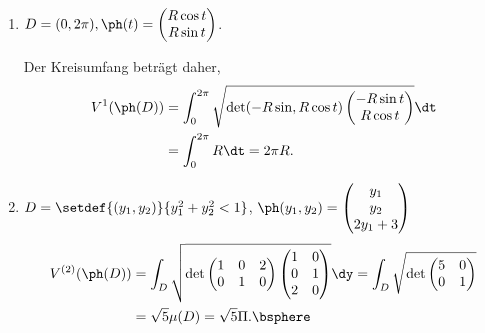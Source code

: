 \begin{bsp}
\label{bsp:4.20}
\begin{enumerate}[label=\arabic{*}.)]
  \item $D=(0,2\pi), \ph(t) = \begin{pmatrix}R\cos t\\R\sin t\end{pmatrix}$.
                              
Der Kreisumfang beträgt daher,
\begin{align*}
V^{1}(\ph(D)) &= \int_0^{2\pi} \sqrt{\det (-R\sin,R\cos t)\begin{pmatrix}-R\sin
t\\R\cos t\end{pmatrix}} \dt \\ &= \int_0^{2\pi} R\dt = 2\pi R.
\end{align*}
\item $D=\setdef{(y_1,y_2)}{y_1^2+y_2^2 < 1}$, $\ph(y_1,y_2) = \begin{pmatrix}
y_1 \\ y_2 \\ 2y_1 + 3
\end{pmatrix}$
\begin{align*}
V^{(2)}(\ph(D)) &= \int_D \sqrt{\det
\begin{pmatrix}
1 & 0 & 2\\ 0 & 1 & 0\end{pmatrix}\begin{pmatrix}
1 & 0 \\ 0 & 1 \\ 2 & 0\end{pmatrix}}
\dy
= \int_D \sqrt{\det\begin{pmatrix}
5 & 0 \\ 0 & 1\end{pmatrix}}
\\ &= \sqrt{5}\mu(D) = \sqrt{5}\Pi.\bsphere
\end{align*} 
\end{enumerate}
\end{bsp}

